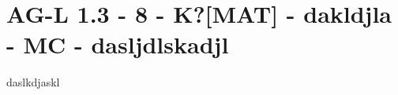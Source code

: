 \section{AG-L 1.3 - 8 - K?[MAT] - dakldjla - MC - dasljdlskadjl}

\begin{beispiel}[AG-L 1.3]{1}
daslkdjaskl
\end{beispiel}